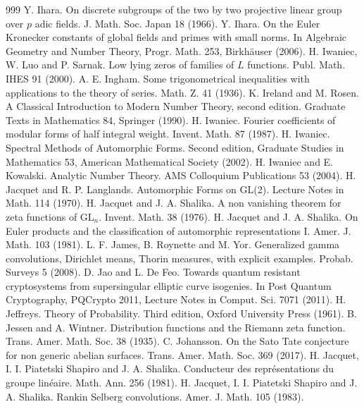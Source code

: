 \begin{thebibliography}{999}
 Y. Ihara. On discrete subgroups of the two by two projective linear group over $p$ adic fields. J. Math. Soc. Japan 18 (1966).
 Y. Ihara. On the Euler Kronecker constants of global fields and primes with small norms. In Algebraic Geometry and Number Theory, Progr. Math. 253, Birkh\"auser (2006).
 H. Iwaniec, W. Luo and P. Sarnak. Low lying zeros of families of $L$ functions. Publ. Math. IHES 91 (2000).
 A. E. Ingham. Some trigonometrical inequalities with applications to the theory of series. Math. Z. 41 (1936).
 K. Ireland and M. Rosen. A Classical Introduction to Modern Number Theory, second edition. Graduate Texts in Mathematics 84, Springer (1990).
 H. Iwaniec. Fourier coefficients of modular forms of half integral weight. Invent. Math. 87 (1987).
 H. Iwaniec. Spectral Methods of Automorphic Forms. Second edition, Graduate Studies in Mathematics 53, American Mathematical Society (2002).
 H. Iwaniec and E. Kowalski. Analytic Number Theory. AMS Colloquium Publications 53 (2004).
 H. Jacquet and R. P. Langlands. Automorphic Forms on GL(2). Lecture Notes in Math. 114 (1970).
 H. Jacquet and J. A. Shalika. A non vanishing theorem for zeta functions of $\mathrm{GL}_n$. Invent. Math. 38 (1976).
 H. Jacquet and J. A. Shalika. On Euler products and the classification of automorphic representations I. Amer. J. Math. 103 (1981).
 L. F. James, B. Roynette and M. Yor. Generalized gamma convolutions, Dirichlet means, Thorin measures, with explicit examples. Probab. Surveys 5 (2008).
 D. Jao and L. De Feo. Towards quantum resistant cryptosystems from supersingular elliptic curve isogenies. In Post Quantum Cryptography, PQCrypto 2011, Lecture Notes in Comput. Sci. 7071 (2011).
 H. Jeffreys. Theory of Probability. Third edition, Oxford University Press (1961).
 B. Jessen and A. Wintner. Distribution functions and the Riemann zeta function. Trans. Amer. Math. Soc. 38 (1935).
 C. Johansson. On the Sato Tate conjecture for non generic abelian surfaces. Trans. Amer. Math. Soc. 369 (2017).
 H. Jacquet, I. I. Piatetski Shapiro and J. A. Shalika. Conducteur des repr\'esentations du groupe lin\'eaire. Math. Ann. 256 (1981).
 H. Jacquet, I. I. Piatetski Shapiro and J. A. Shalika. Rankin Selberg convolutions. Amer. J. Math. 105 (1983).

\end{thebibliography}
